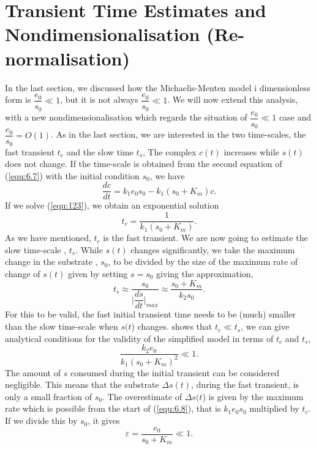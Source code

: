 \documentclass[a4paper]{report}
\theoremstyle{definition}
\begin{document}
\section{Transient Time Estimates and Nondimensionalisation (Re-normalisation)}
In the last section, we discussed how the Michaelis-Menten model i dimensionless form is $\dfrac{e_0}{s_0}\ll1$, but it is not always $\dfrac{e_0}{s_0}\ll1$. We will now extend this analysis, with a new nondimensionalisation which regards the situation of $\dfrac{e_0}{s_0}\ll1$ case and $\dfrac{e_0}{s_0}=O(1)$.
As in the last section, we are interested in the two time-scales, the fast transient $t_c$ and the slow time $t_s$,  The complex $c(t)$ increases  while $s(t)$ does not change.  If the time-scale is obtained from the second equation of (\ref{equ:6.7}) with the initial condition $s_0$, we have
\begin{equation}
\label{equ:123}
\dfrac{dc}{dt}=k_1e_0s_0-k_1(s_0+K_m)c.
\end{equation}
If we solve (\ref{equ:123}), we obtain an exponential solution
\begin{equation}
\label{equ:2.16}
t_c=\dfrac{1}{k_1(s_0+K_m)}.
\end{equation}
As we have mentioned, $t_c$ is the fast transient. We are now going to estimate the slow time-scale , $t_s$. While $s(t)$ changes significantly, we take the maximum change  in the substrate , $s_0$, to be divided by the size of the maximum rate of change of $s(t)$ given by setting $s=s_0$ giving the approximation,
\begin{equation}
t_s\approx\dfrac{s_0}{\vert \dfrac{ds}{dt}\vert_{max}}\approx\dfrac{s_0+K_m}{k_2s_0}.
\end{equation}
For this to be valid,  the fast initial transient time needs to be (much) smaller than the slow time-scale when $s(t$) changes.
 shows that  $t_c\ll t_s$, we can give analytical conditions for the validity of the simplified model in terms of $t_c$ and $t_s$, 
\begin{equation}
\label{equ:6.17}
\dfrac{k_{2}e_{0}}{k_{1}(s_{0}+K_{m})^2}\ll1.
\end{equation}
The amount of $s$ consumed during the initial transient can be considered negligible. This means that the substrate $\Delta s(t)$, during the fast transient, is only a small fraction of $s_0$. The overestimate of $\Delta s(t$) is given by the maximum rate which is possible from the start of (\ref{equ:6.8}), that is $k_1e_0s_0$ multiplied by $t_c$. If we divide this by $s_0$, it gives
\begin{equation}
\label{equ:6.18}
\varepsilon=\dfrac{e_0}{s_0+K_m}\ll1.
\end{equation}
\end{document}
